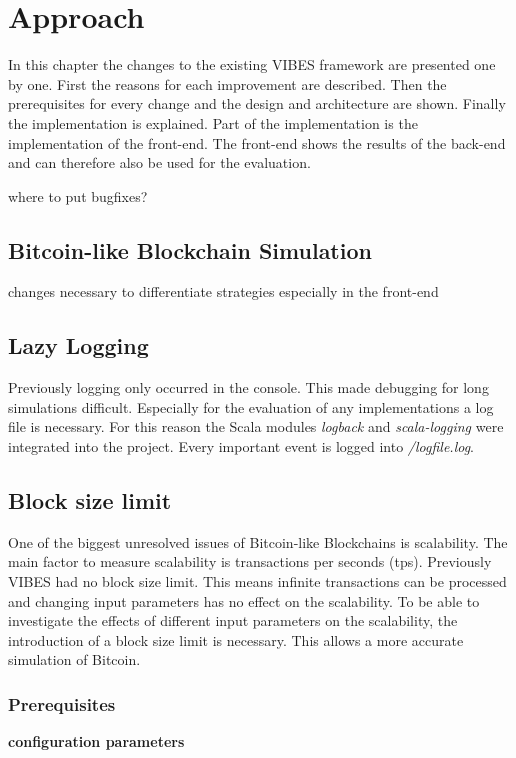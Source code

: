 \chapter{Approach}\label{chapter:approach}
In this chapter the changes to the existing VIBES framework are presented one by one. First the reasons for each improvement are described. Then the prerequisites for every change and the design and architecture are shown. Finally the implementation is explained. Part of the implementation is the implementation of the front-end. The front-end shows the results of the back-end and can therefore also be used for the evaluation.

where to put bugfixes?

\section{Bitcoin-like Blockchain Simulation}
changes necessary to differentiate strategies
especially in the front-end

\section{Lazy Logging}
Previously logging only occurred in the console. This made debugging for long simulations difficult. Especially for the evaluation of any implementations a log file is necessary. For this reason the Scala modules \textit{logback} and \textit{scala-logging} were integrated into the project. Every important event is logged into \textit{/logfile.log}.

\section{Block size limit}
One of the biggest unresolved issues of Bitcoin-like Blockchains is scalability. The main factor to measure scalability is transactions per seconds (tps). Previously VIBES had no block size limit. This means infinite transactions can be processed and changing input parameters has no effect on the scalability. To be able to investigate the effects of different input parameters on the scalability, the introduction of a block size limit is necessary. This allows a more accurate simulation of Bitcoin.

\subsection{Prerequisites}
\textbf{configuration parameters}

